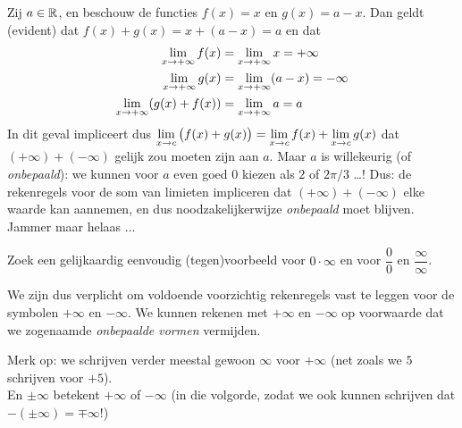 \documentclass[numbers]{ximera}
\begin{document}
\begin{example}
	Zij $a\in\mathbb{R}$, en beschouw de functies $f(x)=x$ en $g(x)=a-x$. Dan geldt (evident) dat $f(x)+g(x)=x+(a-x)=a$ en dat 
	\begin{align*}
	\limxi f(x) & = \limxi x = +\infty \\
	\limxi g(x) & = \limxi (a-x) = -\infty \\
	\limxi (g(x)+f(x)) & = \limxi a = a \\
	\end{align*}
    In dit geval impliceert dus $\limxc \big(f(x) +g(x)\big) = \limxc f(x) + \limxc g(x)$ dat $(+\infty) + (-\infty)$ gelijk zou moeten zijn aan $a$. Maar $a$ is willekeurig (of \textit{onbepaald}): we kunnen voor $a$ even goed $0$ kiezen als $2$ of $2\pi/3$ \dots! Dus: de rekenregels voor de som van limieten impliceren dat $(+\infty)+(-\infty)$ elke waarde kan aannemen, en dus noodzakelijkerwijze \textit{onbepaald} moet blijven. Jammer maar helaas ...
    
    
\end{example}
\begin{example}
	
Zoek een gelijkaardig eenvoudig (tegen)voorbeeld voor $0\cdot\infty$ en voor $\dfrac00$ en $\dfrac\infty\infty$.
\end{example}



We zijn dus verplicht om voldoende voorzichtig rekenregels vast te leggen voor de symbolen $+\infty$ en $-\infty$. We kunnen rekenen met $+\infty$ en $-\infty$  op voorwaarde dat we zogenaamde \textit{onbepaalde vormen} vermijden.

Merk op: we schrijven verder meestal gewoon $\infty$ voor $+\infty$ (net zoals we $5$ schrijven voor $+5$). \\
En $\pm\infty$ betekent $+\infty$ of $-\infty$ (in die volgorde, zodat we ook kunnen schrijven dat $-(\pm\infty) = \mp\infty$!)
\end{document}
